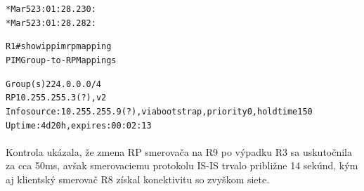 \documentclass[12pt,twoside,a4paper]{report}
\begin{document}
\noindent
{\selectfont
\begin{small}
\begin{alltt}
*Mar  5 23:01:28.230: %
*Mar  5 23:01:28.282: %
\end{alltt}
\end{small}
}

\noindent
{\selectfont
\begin{small}
\begin{alltt}

R1#show ip pim rp mapping
PIM Group-to-RP Mappings

Group(s) 224.0.0.0/4
  RP 10.255.255.3 (?), v2
    Info source: 10.255.255.9 (?), via bootstrap, priority 0, holdtime 150
         Uptime: 4d20h, expires: 00:02:13

\end{alltt}
\end{small}
}

\paragraph{}
Kontrola ukázala, že zmena RP smerovača na R9 po výpadku R3 sa uskutočnila za cca 50ms, avšak smerovaciemu protokolu IS-IS trvalo približne 14 sekúnd, kým aj klientský smerovač R8 získal konektivitu so zvyškom siete.
\end{document}
